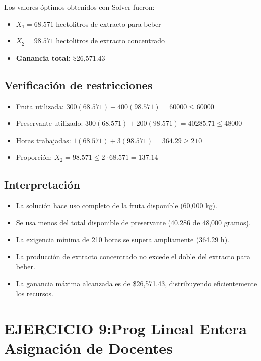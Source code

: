 \documentclass[12pt, a4paper, oneside]{book}
\theoremstyle{definition}
\begin{document}
Los valores óptimos obtenidos con Solver fueron:

\begin{itemize}
    \item \( X_1 = 68.571 \) hectolitros de extracto para beber
    \item \( X_2 = 98.571 \) hectolitros de extracto concentrado
    \item \textbf{Ganancia total:} \$26,571.43
\end{itemize}

\subsection{Verificación de restricciones}

\begin{itemize}
    \item Fruta utilizada: \( 300(68.571) + 400(98.571) = 60000 \leq 60000 \)
    \item Preservante utilizado: \( 300(68.571) + 200(98.571) = 40285.71 \leq 48000 \)
    \item Horas trabajadas: \( 1(68.571) + 3(98.571) = 364.29 \geq 210 \)
    \item Proporción: \( X_2 = 98.571 \leq 2 \cdot 68.571 = 137.14 \)
\end{itemize}

\subsection{Interpretación}

\begin{itemize}
    \item La solución hace uso completo de la fruta disponible (60,000 kg).
    \item Se usa menos del total disponible de preservante (40,286 de 48,000 gramos).
    \item La exigencia mínima de 210 horas se supera ampliamente (364.29 h).
    \item La producción de extracto concentrado no excede el doble del extracto para beber.
    \item La ganancia máxima alcanzada es de \$26,571.43, distribuyendo eficientemente los recursos.
\end{itemize}


\newpage
\section{EJERCICIO 9:Prog Lineal Entera Asignación de Docentes}
\end{document}
